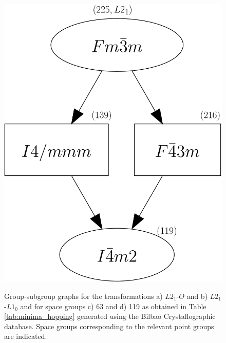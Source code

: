 \documentclass[%
preprint,
 amsmath,amssymb,
 aps,
prb,
showkeys,
]{revtex4-1}
\begin{document}
\begin{figure}[htp!]
{  \includegraphics[scale=0.25]{figure_4d}}
\caption{Group-subgroup graphs for the transformations a) $L2_1$-$O$ and b) $L2_1$-$L1_0$  and for space groups c) 63 and d) 119  as obtained in Table \ref{tab:minima_hopping} generated using the Bilbao Crystallographic database. Space groups corresponding to the relevant point groups are indicated.}
\label{subgroups}
\end{figure}
\end{document}
